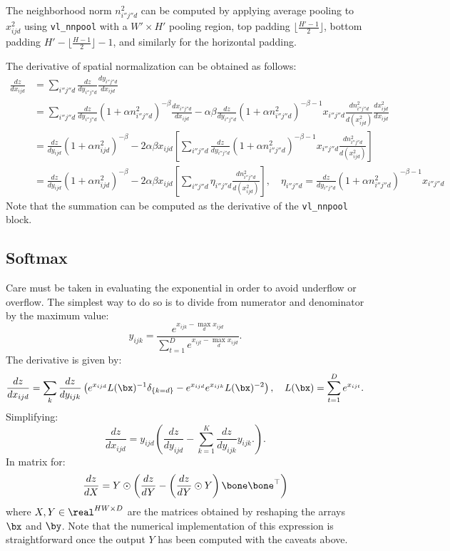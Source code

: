 The neighborhood norm $n^2_{i''j''d}$ can be computed by applying average pooling to $x_{ijd}^2$ using \verb!vl_nnpool! with a $W'\times H'$ pooling region, top padding $\lfloor \frac{H'-1}{2}\rfloor$, bottom padding $H'-\lfloor \frac{H-1}{2}\rfloor-1$, and similarly for the horizontal padding.

The derivative of spatial normalization can be obtained as follows:
\begin{align*}
\frac{dz}{dx_{ijd}} 
&= \sum_{i''j''d}
\frac{dz}{d y_{i''j''d}} 
\frac{d y_{i''j''d}}{d x_{ijd}}
\\
&=
\sum_{i''j''d}
\frac{dz}{d y_{i''j''d}} 
(1 + \alpha n_{i''j''d}^2)^{-\beta}
\frac{dx_{i''j''d}}{d x_{ijd}} 
-\alpha\beta
\frac{dz}{d y_{i''j''d}} 
(1 + \alpha n_{i''j''d}^2)^{-\beta-1}
x_{i''j''d}
\frac{dn_{i''j''d}^2}{d (x^2_{ijd})} 
\frac{dx^2_{ijd}}{d x_{ijd}}
\\
&=
\frac{dz}{d y_{ijd}} 
(1 + \alpha n_{ijd}^2)^{-\beta}
-2\alpha\beta x_{ijd}
\left[
\sum_{i''j''d}
\frac{dz}{d y_{i''j''d}} 
(1 + \alpha n_{i''j''d}^2)^{-\beta-1}
x_{i''j''d}
\frac{dn_{i''j''d}^2}{d (x_{ijd}^2)}
\right]
\\
&=
\frac{dz}{d y_{ijd}} 
(1 + \alpha n_{ijd}^2)^{-\beta}
-2\alpha\beta x_{ijd}
\left[
\sum_{i''j''d}
\eta_{i''j''d}
\frac{dn_{i''j''d}^2}{d (x_{ijd}^2)}
\right],
\quad
\eta_{i''j''d}=
\frac{dz}{d y_{i''j''d}} 
(1 + \alpha n_{i''j''d}^2)^{-\beta-1}
x_{i''j''d}
\end{align*}
Note that the summation can be computed as the derivative of the
\verb!vl_nnpool! block.

\subsection{Softmax}\label{s:impl-softmax}

Care must be taken in evaluating the exponential in order to avoid underflow or overflow. The simplest way to do so is to divide from numerator and denominator by the maximum value:
\[
 y_{ijk} = \frac{e^{x_{ijk} - \max_d x_{ijd}}}{\sum_{t=1}^D e^{x_{ijt}- \max_d x_{ijd}}}.
\]
The derivative is given by:
\[
\frac{dz}{d x_{ijd}}
=
\sum_{k}
\frac{dz}{d y_{ijk}}
\left(
e^{x_{ijd}} L(\bx)^{-1} \delta_{\{k=d\}}
-
e^{x_{ijd}}
e^{x_{ijk}} L(\bx)^{-2}
\right),
\quad
L(\bx) = \sum_{t=1}^D e^{x_{ijt}}.
\]
Simplifying:
\[
\frac{dz}{d x_{ijd}}
=
y_{ijd} 
\left(
\frac{dz}{d y_{ijd}}
-
\sum_{k=1}^K
\frac{dz}{d y_{ijk}} y_{ijk}.
\right).
\]
In matrix for:
\[
  \frac{dz}{dX} = Y \odot \left(\frac{dz}{dY} 
  - \left(\frac{dz}{dY} \odot Y\right) \bone\bone^\top\right)
\]
where $X,Y\in\real^{HW\times D}$ are the matrices obtained by reshaping the arrays
$\bx$ and $\by$. Note that the numerical implementation of this expression is straightforward once the output $Y$ has been computed with the caveats above.

